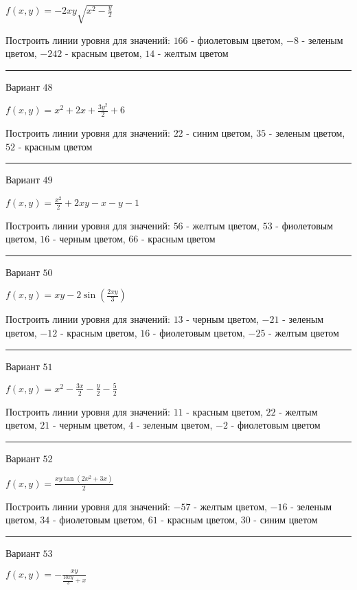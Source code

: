 \documentclass[11pt]{report}
\begin{document}
$f(x, y) = - 2 x y \sqrt{x^{2} - \frac{y}{2}}$

Построить линии уровня для значений: $166$ - фиолетовым цветом, $-8$ - зеленым цветом, $-242$ - красным цветом, $14$ - желтым цветом
\begin{center}
\noindent\rule{8cm}{0.4pt}
\end{center}
Вариант $48$


$f(x, y) = x^{2} + 2 x + \frac{3 y^{2}}{2} + 6$

Построить линии уровня для значений: $22$ - синим цветом, $35$ - зеленым цветом, $52$ - красным цветом
\begin{center}
\noindent\rule{8cm}{0.4pt}
\end{center}
Вариант $49$


$f(x, y) = \frac{x^{2}}{2} + 2 x y - x - y - 1$

Построить линии уровня для значений: $56$ - желтым цветом, $53$ - фиолетовым цветом, $16$ - черным цветом, $66$ - красным цветом
\begin{center}
\noindent\rule{8cm}{0.4pt}
\end{center}
Вариант $50$


$f(x, y) = x y - 2 \sin{\left(\frac{2 x y}{3} \right)}$

Построить линии уровня для значений: $13$ - черным цветом, $-21$ - зеленым цветом, $-12$ - красным цветом, $16$ - фиолетовым цветом, $-25$ - желтым цветом
\begin{center}
\noindent\rule{8cm}{0.4pt}
\end{center}
Вариант $51$


$f(x, y) = x^{2} - \frac{3 x}{2} - \frac{y}{2} - \frac{5}{2}$

Построить линии уровня для значений: $11$ - красным цветом, $22$ - желтым цветом, $21$ - черным цветом, $4$ - зеленым цветом, $-2$ - фиолетовым цветом
\begin{center}
\noindent\rule{8cm}{0.4pt}
\end{center}
Вариант $52$


$f(x, y) = \frac{x y \tan{\left(2 x^{2} + 3 x \right)}}{2}$

Построить линии уровня для значений: $-57$ - желтым цветом, $-16$ - зеленым цветом, $34$ - фиолетовым цветом, $61$ - красным цветом, $30$ - синим цветом
\begin{center}
\noindent\rule{8cm}{0.4pt}
\end{center}
Вариант $53$


$f(x, y) = - \frac{x y}{\frac{10 x y}{3} + x}$
\end{document}
